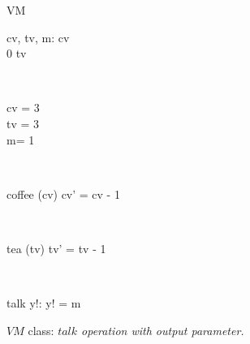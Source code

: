 \begin{figure}[H]
\centering
\begin{class}{VM}
\\
\begin{state}
cv, tv, m: \integer
{} \leq  cv 
\\
0 \leq  tv 
\end{state} 
\\
\begin{init}
cv = 3
\\tv = 3
\\ m= 1
\end{init} 
\\
\begin{op}{coffee}
\Delta (cv)
\ST
cv' = cv - 1
\end{op}
\\
\begin{op}{tea}
\Delta (tv)
\ST
tv' = tv - 1
\end{op}
\\
\begin{op}{talk}
y!: \integer
\ST
y! = m
\end{op}
\end{class}
\caption{$VM$ class: \textit{$talk$ operation with output parameter.}}
\label{oz_vm_with_operation_input_output_parameters}
\end{figure}